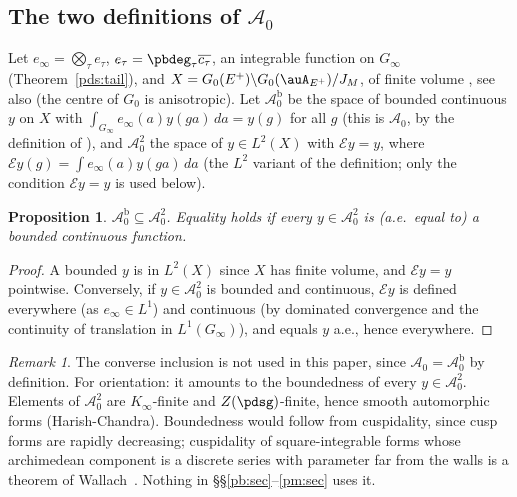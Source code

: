 \documentclass[10pt]{amsart}
\newtheorem{proposition}[theorem]{Proposition}
\theoremstyle{definition}
\theoremstyle{remark}
\newtheorem{remark}[theorem]{Remark}
\providecommand{\auAz}{\mathcal A_0}
\providecommand{\aubar}[1]{\overline{#1}}
\begin{document}
\subsection{The two definitions of \texorpdfstring{$\auAz$}{A0}}\label{pds:ss-A0}

Let $e_\infty=\bigotimes_\tau e_\tau$, $e_\tau=\pbdeg_\tau\aubar{c_\tau}$, an integrable function on
$G_\infty$ (Theorem~\ref{pds:tail}), and $X=G_0(E^+)\backslash G_0(\auA_{E^+})/J_M$, of finite volume
\cite[Theorem~5.6(i)]{BorelFin}, see also \cite[Theorem~9.4]{BorelHC1962} (the centre of $G_0$ is anisotropic). Let $\auAz^{\mathrm b}$ be the space of bounded
continuous $y$ on $X$ with $\int_{G_\infty}e_\infty(a)y(ga)\,da=y(g)$ for all $g$ (this is $\auAz$, by
the definition of {\cite[\S14.3]{P46}}), and $\auAz^2$ the space of $y\in L^2(X)$ with $\mathcal Ey=y$,
where $\mathcal Ey(g)=\int e_\infty(a)y(ga)\,da$ (the $L^2$ variant of the definition; only the
condition $\mathcal Ey=y$ is used below).

\begin{proposition}\label{pds:A0}
$\auAz^{\mathrm b}\subseteq\auAz^2$. Equality holds if every $y\in\auAz^2$ is (a.e.\ equal to) a bounded
continuous function.
\end{proposition}
\begin{proof}
A bounded $y$ is in $L^2(X)$ since $X$ has finite volume, and $\mathcal Ey=y$ pointwise. Conversely, if
$y\in\auAz^2$ is bounded and continuous, $\mathcal Ey$ is defined everywhere (as $e_\infty\in L^1$) and
continuous (by dominated convergence and the continuity of translation in $L^1(G_\infty)$), and
equals $y$ a.e., hence everywhere.
\end{proof}

\begin{remark}\label{pds:rem-A0}
The converse inclusion is not used in this paper, since $\auAz=\auAz^{\mathrm b}$ by definition.
For orientation: it amounts to the boundedness of every $y\in\auAz^2$. Elements of $\auAz^2$ are $K_\infty$-finite and
$Z(\pdsg)$-finite, hence smooth automorphic forms (Harish-Chandra). Boundedness would follow from
cuspidality, since cusp forms are rapidly decreasing; cuspidality of square-integrable forms whose
archimedean component is a discrete series with parameter far from the walls is a theorem of
Wallach~\cite{WallachCT}. Nothing in \S\S\ref{pb:sec}--\ref{pm:sec} uses it.
\end{remark}
\end{document}
